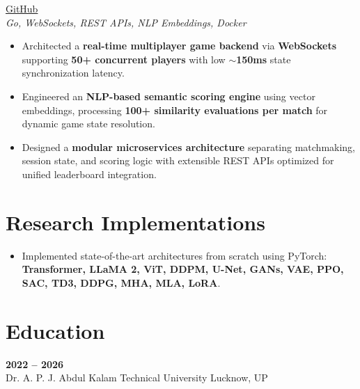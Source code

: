 \documentclass[a4paper,10pt]{article}
\begin{document}
\begin{description}[leftmargin=!,labelwidth=0.5cm]
    \item[\textbf{Semantic-Duel}] \hfill \href{https://github.com/Atharv-3105/Semantic-Duel}{GitHub} \\
    \textit{Go, WebSockets, REST APIs, NLP Embeddings, Docker}

    \begin{itemize}
        \item Architected a \textbf{real-time multiplayer game backend} via \textbf{WebSockets} supporting \textbf{50+ concurrent players} with low \textbf{$\sim$150ms} state synchronization latency.
        \item Engineered an \textbf{NLP-based semantic scoring engine} using vector embeddings, processing \textbf{100+ similarity evaluations per match} for dynamic game state resolution.
        \item Designed a \textbf{modular microservices architecture} separating matchmaking, session state, and scoring logic with extensible REST APIs optimized for unified leaderboard integration.
    \end{itemize}

\end{description}

\section*{Research Implementations}
\begin{itemize}
    \item Implemented state-of-the-art architectures from scratch using PyTorch: \textbf{Transformer, LLaMA 2, ViT, DDPM, U-Net, GANs, VAE, PPO, SAC, TD3, DDPG, MHA, MLA, LoRA}.
\end{itemize}

\section*{Education}
\begin{description}[leftmargin=!,labelwidth=0.5cm]
    \item[\textbf{Bachelor of Technology in Artificial Intelligence \& Machine Learning}] \hfill \textbf{2022 -- 2026} \\
    Dr. A. P. J. Abdul Kalam Technical University \hfill Lucknow, UP
\end{description}
\end{document}
